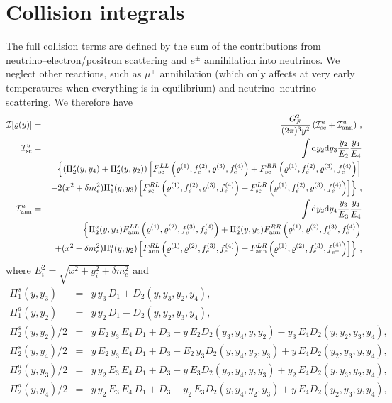 \documentclass[notitlepage,showpacs,preprintnumbers,amsmath,amssymb,superscriptaddress,prd,onecolumn]{revtex4-1}
\begin{document}
\section{Collision integrals}
\label{sec:collint}
The full collision terms are defined by the sum
of the contributions from neutrino--electron/positron scattering and
$e^\pm$ annihilation into neutrinos.
We neglect other reactions, such as $\mu^\pm$ annihilation (which only affects at very early temperatures when everything is in equilibrium)
and neutrino--neutrino scattering.
We therefore have \cite{deSalas:2016ztq}
%
\begin{eqnarray}
\mathcal{I}[\varrho(y)]
&=&
\frac{G_F^2}{(2\pi)^3y^2}
\left(\mathcal{I}_{\rm sc}^u + \mathcal{I}_{\rm ann}^u\right)\,,
\label{eq:collint}
\\
\mathcal{I}_{\rm sc} ^u
&=&
\int {\rm d}y_2 {\rm d}y_3 \frac{y_2}{E_2} \frac{y_4}{E_4}
\label{eq:I_sc}
\\
&&
\left\{\left(\Pi_2^s(y, y_4)+\Pi_2^s(y, y_2)\right)
    \left[
    F_{\rm sc}^{LL}\left(\varrho^{(1)}, f_e^{(2)}, \varrho^{(3)}, f_e^{(4)}\right)
    +F_{\rm sc}^{RR}\left(\varrho^{(1)}, f_e^{(2)}, \varrho^{(3)}, f_e^{(4)}\right)\right]\right.
    \nonumber\\
    &&\left.-2(x^2+\delta m_e^2)\Pi_1^s(y,y_3)
    \left[
     F_{\rm sc}^{RL}\left(\varrho^{(1)}, f_e^{(2)}, \varrho^{(3)}, f_e^{(4)}\right)
    +F_{\rm sc}^{LR}\left(\varrho^{(1)}, f_e^{(2)}, \varrho^{(3)}, f_e^{(4)}\right)
    \right]\nonumber
\right\}\,,
\\
\mathcal{I}_{\rm ann}^u
&=&
\int {\rm d}y_2 {\rm d}y_4 \frac{y_3}{E_3} \frac{y_4}{E_4}
\label{eq:I_ann}\\
    &&\left\{\Pi_2^a(y, y_4)F_{\rm ann}^{LL}\left(\varrho^{(1)}, \varrho^{(2)}, f_e^{(3)}, f_e^{(4)}\right)
    +\Pi_2^a(y, y_3)F_{\rm ann}^{RR}\left(\varrho^{(1)}, \varrho^{(2)}, f_e^{(3)}, f_e^{(4)}\right)\right.
\nonumber\\
    &&\left.+ (x^2+\delta m_e^2)\Pi_1^a(y,y_2)
    \left[
    F_{\rm ann}^{RL}\left(\varrho^{(1)}, \varrho^{(2)}, f_e^{(3)}, f_e^{(4)}\right)
    +F_{\rm ann}^{LR}\left(\varrho^{(1)}, \varrho^{(2)}, f_e^{(3)}, f_{e^+}^{(4)}\right)
    \right]\nonumber
\right\}\,,
\end{eqnarray}
where $E^2_i = \sqrt{x^2+y_i^2+\delta m_e^2}$ and
\begin{eqnarray}
\Pi_1^s(y,y_3)
&=&
y\,y_3\,D_1+D_2(y,y_3,y_2,y_4),
\\
\Pi_1^a(y,y_2)
&=&
y\,y_2\,D_1-D_2(y,y_2,y_3,y_4),
\\
\Pi_2^s(y,y_2)/2
&=&
y\,E_2\,y_3\,E_4\,D_1 + D_3 - y\,E_2 D_2(y_3,y_4,y,y_2) - y_3\,E_4 D_2(y,y_2,y_3,y_4),
\\
\Pi_2^s(y,y_4)/2
&=&
y\,E_2\,y_3\,E_4\,D_1 + D_3 + E_2\,y_3 D_2(y,y_4,y_2,y_3) + y\,E_4 D_2(y_2,y_3,y,y_4),
\\
\Pi_2^a(y,y_3)/2
&=&
y\,y_2\,E_3\,E_4\,D_1 + D_3 + y\,E_3 D_2(y_2,y_4,y,y_3) + y_2\,E_4 D_2(y,y_3,y_2,y_4),
\\
\Pi_2^a(y,y_4)/2
&=&
y\,y_2\,E_3\,E_4\,D_1 + D_3 + y_2\,E_3 D_2(y,y_4,y_2,y_3) + y\,E_4 D_2(y_2,y_3,y,y_4),
\end{eqnarray}
\end{document}
